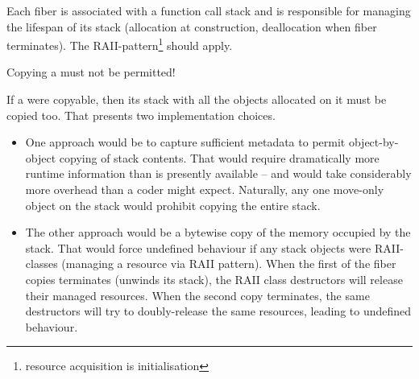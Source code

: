\label{stackmgmt}

Each fiber is associated with a function call stack and is responsible for
managing the lifespan of its stack (allocation at construction, deallocation
when fiber terminates). The RAII-pattern\footnote{resource acquisition is
initialisation} should apply.

Copying a \fiber must not be permitted!

If a \fiber were copyable, then its stack with all the objects allocated on it
must be copied too. That presents two implementation choices.
\begin{itemize}
    \item One approach would be to capture sufficient metadata to permit
          object-by-object copying of stack contents. That would require
          dramatically more runtime information than is presently available --
          and would take considerably more overhead than a coder might expect.
          Naturally, any one move-only object on the stack would prohibit
          copying the entire stack.
    \item The other approach would be a bytewise copy of the memory occupied
          by the stack. That would force undefined behaviour if any stack
          objects were RAII-classes (managing a resource via RAII pattern). When the first
          of the fiber copies terminates (unwinds its stack), the RAII class destructors
          will release their managed resources. When the second copy terminates, the same
          destructors will try to doubly-release the same resources, leading to undefined
          behaviour.
\end{itemize}

